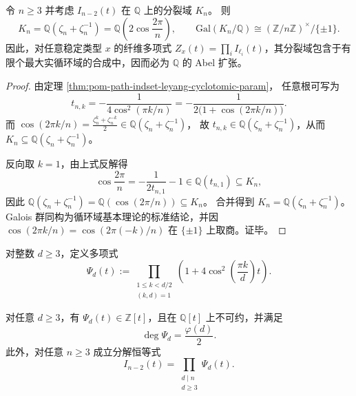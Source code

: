 \begin{theorem}[路径分量零点的分裂域为最大实循环域]\label{thm:pom-path-indset-splitting-field-real-cyclotomic}
令 \(n\ge 3\) 并考虑 \(I_{n-2}(t)\) 在 \(\mathbb Q\) 上的分裂域 \(K_n\)。
则
\[
K_n=\mathbb Q(\zeta_n+\zeta_n^{-1})=\mathbb Q\!\left(2\cos\frac{2\pi}{n}\right),
\qquad
\mathrm{Gal}(K_n/\mathbb Q)\cong (\mathbb Z/n\mathbb Z)^\times/\{\pm 1\}.
\]
因此，对任意稳定类型 \(x\) 的纤维多项式 \(Z_x(t)=\prod_i I_{\ell_i}(t)\)，其分裂域包含于有限个最大实循环域的合成中，因而必为 \(\mathbb Q\) 的 Abel 扩张。
\end{theorem}

\begin{proof}
由定理 \ref{thm:pom-path-indset-leyang-cyclotomic-param}，
任意根可写为
\[
t_{n,k}
=-\frac{1}{4\cos^2(\pi k/n)}
=-\frac{1}{2\bigl(1+\cos(2\pi k/n)\bigr)}.
\]
而
\(
\cos(2\pi k/n)=\frac{\zeta_n^k+\zeta_n^{-k}}{2}\in \mathbb Q(\zeta_n+\zeta_n^{-1})
\)，
故 \(t_{n,k}\in\mathbb Q(\zeta_n+\zeta_n^{-1})\)，从而 \(K_n\subseteq\mathbb Q(\zeta_n+\zeta_n^{-1})\)。

反向取 \(k=1\)，由上式反解得
\[
\cos\frac{2\pi}{n}=-\frac{1}{2t_{n,1}}-1\in\mathbb Q(t_{n,1})\subseteq K_n,
\]
因此 \(\mathbb Q(\zeta_n+\zeta_n^{-1})=\mathbb Q(\cos(2\pi/n))\subseteq K_n\)。
合并得到 \(K_n=\mathbb Q(\zeta_n+\zeta_n^{-1})\)。
Galois 群同构为循环域基本理论的标准结论，并因 \(\cos(2\pi k/n)=\cos(2\pi(-k)/n)\) 在 \(\{\pm 1\}\) 上取商。证毕。
\end{proof}

\begin{definition}\label{def:pom-psi-cyclotomic-factor}
对整数 \(d\ge 3\)，定义多项式
\[
\Psi_d(t):=
\prod_{\substack{1\le k<d/2\\(k,d)=1}}
\left(1+4\cos^2\!\left(\frac{\pi k}{d}\right)t\right).
\]
\end{definition}

\begin{theorem}\label{thm:pom-path-indset-psi-factorization-irreducible}
对任意 \(d\ge 3\)，有 \(\Psi_d(t)\in\mathbb Z[t]\)，且在 \(\mathbb Q[t]\) 上不可约，并满足
\[
\deg \Psi_d=\frac{\varphi(d)}{2}.
\]
此外，对任意 \(n\ge 3\) 成立分解恒等式
\[
I_{n-2}(t)=\prod_{\substack{d\mid n\\ d\ge 3}} \Psi_d(t).
\]
\end{theorem}

